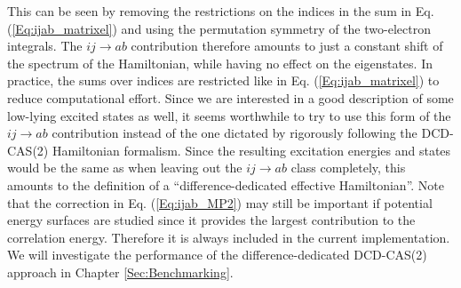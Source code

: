 This can be seen by removing the restrictions on the indices in the sum in Eq. (\ref{Eq:ijab_matrixel}) and using the permutation symmetry of the two-electron integrals. The $ij\rightarrow ab$ contribution therefore amounts to just a constant shift of the spectrum of the Hamiltonian, while having no effect on the eigenstates. In practice, the sums over indices are restricted like in Eq. (\ref{Eq:ijab_matrixel}) to reduce computational effort. Since we are interested in a good description of some low-lying excited states as well, it seems worthwhile to try to use this form of the $ij\rightarrow ab$ contribution instead of the one dictated by rigorously following the DCD-CAS(2) Hamiltonian formalism. Since the resulting excitation energies and states would be the same as when leaving out the $ij\rightarrow ab$ class completely, this amounts to the definition of a “difference-dedicated effective Hamiltonian”. Note that the correction in Eq. (\ref{Eq:ijab_MP2}) may still be important if potential energy surfaces are studied since it provides the largest contribution to the correlation energy. Therefore it is always included in the current implementation. We will investigate the performance of the difference-dedicated DCD-CAS(2) approach in Chapter \ref{Sec:Benchmarking}.

